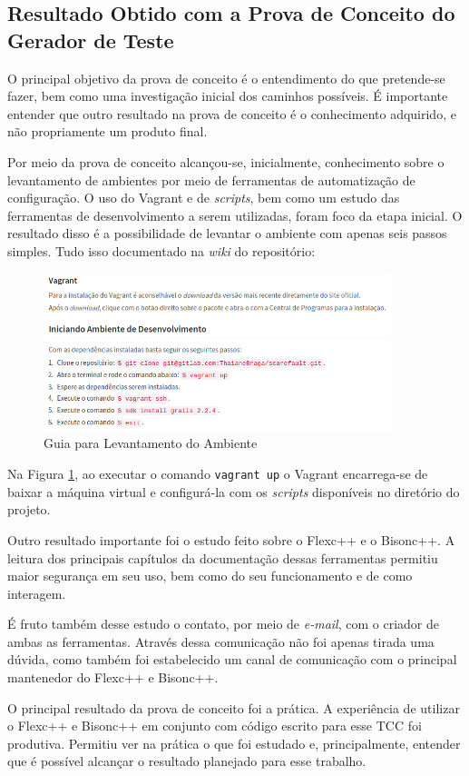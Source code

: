 \subsection{Resultado Obtido com a Prova de Conceito do Gerador de Teste}
O principal objetivo da prova de conceito é o entendimento do que pretende-se fazer, bem como uma investigação inicial dos caminhos possíveis. É importante entender que outro  resultado na prova de conceito é o conhecimento adquirido, e não propriamente um produto final.
\par
\indent Por meio da prova de conceito alcançou-se, inicialmente, conhecimento sobre o levantamento de ambientes por meio de ferramentas de automatização de configuração. O uso do Vagrant e de \textit{scripts}, bem como um estudo das ferramentas de desenvolvimento a serem utilizadas, foram foco da etapa inicial. O resultado disso é a possibilidade de levantar o ambiente com apenas seis passos simples. Tudo isso documentado na \textit{wiki}  do repositório:
\par
\begin{figure}[h]
    \centering
    \includegraphics[width=0.9\textwidth]{figuras/guide-vagrant.png}
    \caption{Guia para Levantamento do Ambiente}
    \label{fig:guide-vagrant}
 \end{figure}
\par
\indent Na Figura \ref{fig:guide-vagrant}, ao executar o comando \lstinline|vagrant up| o Vagrant encarrega-se de baixar a máquina virtual e configurá-la com os \textit{scripts} disponíveis no diretório do projeto.
\par
\indent Outro resultado importante foi o estudo feito sobre o Flexc++ e o Bisonc++. A leitura dos principais capítulos da documentação dessas ferramentas permitiu maior segurança em seu uso, bem como do seu funcionamento e de como interagem.
\par
\indent É fruto também desse estudo o contato, por meio de \textit{e-mail}, com o criador de ambas as ferramentas. Através dessa comunicação não foi apenas tirada uma dúvida, como também foi estabelecido um canal de comunicação com o principal mantenedor do Flexc++ e Bisonc++.
\par
\indent O principal resultado da prova de conceito foi a prática. A experiência de utilizar o Flexc++ e Bisonc++ em conjunto com código escrito para esse TCC foi produtiva. Permitiu ver na prática o que foi estudado e, principalmente, entender que é possível alcançar o resultado planejado para esse trabalho.
\par
\indent 
